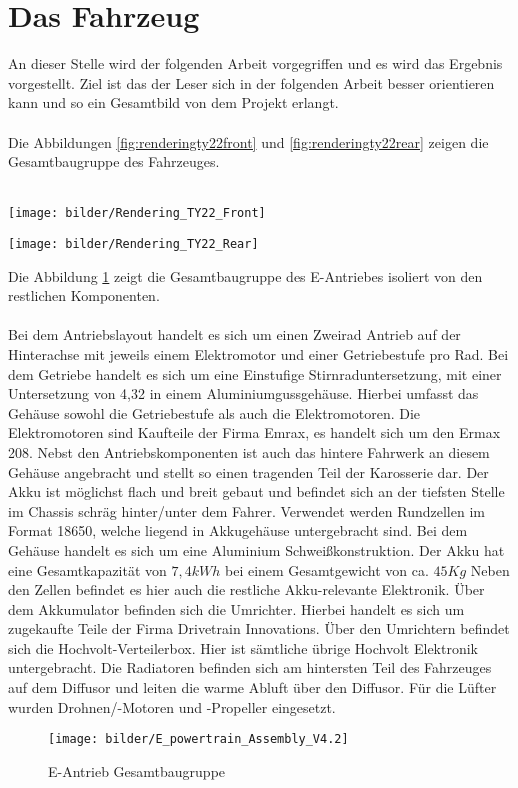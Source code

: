 \section{Das Fahrzeug}
An dieser Stelle wird der folgenden Arbeit vorgegriffen und es wird das Ergebnis vorgestellt. Ziel ist das der Leser sich in der folgenden Arbeit besser orientieren kann und so ein Gesamtbild von dem Projekt erlangt.\\
\\
Die Abbildungen \ref{fig:renderingty22front} und \ref{fig:renderingty22rear} zeigen die Gesamtbaugruppe des Fahrzeuges.\\
\\
	\begin{minipage}[b]{.5\linewidth} %
			\texttt{[image: bilder/Rendering\_TY22\_Front]}
			\label{fig:renderingty22front}
	\end{minipage}
	\begin{minipage}[b]{.5\linewidth} %
			\texttt{[image: bilder/Rendering\_TY22\_Rear]}
			\label{fig:renderingty22rear}
	\end{minipage}

Die Abbildung \ref{fig:epowertrainassemblyv4} zeigt die Gesamtbaugruppe des E-Antriebes isoliert von den restlichen Komponenten.\\
\\
Bei dem Antriebslayout handelt es sich um einen Zweirad Antrieb auf der Hinterachse mit jeweils einem Elektromotor und einer Getriebestufe pro Rad. Bei dem Getriebe handelt es sich um eine Einstufige Stirnraduntersetzung, mit einer Untersetzung von 4,32 in einem Aluminiumgussgehäuse. Hierbei umfasst das Gehäuse sowohl die Getriebestufe als auch die Elektromotoren. Die Elektromotoren sind Kaufteile der Firma Emrax, es handelt sich um den Ermax 208. Nebst den Antriebskomponenten ist auch das hintere Fahrwerk an diesem Gehäuse angebracht und stellt so einen tragenden Teil der Karosserie dar. Der Akku ist möglichst flach und breit gebaut und befindet sich an der tiefsten Stelle im Chassis schräg hinter/unter dem Fahrer. Verwendet werden Rundzellen im Format 18650, welche liegend in Akkugehäuse untergebracht sind. Bei dem Gehäuse handelt es sich um eine Aluminium Schweißkonstruktion. Der Akku hat eine Gesamtkapazität von \ensuremath{7,4 kWh} bei einem Gesamtgewicht von ca. \ensuremath{45 Kg} Neben den Zellen befindet es hier auch die restliche Akku-relevante Elektronik. Über dem Akkumulator befinden sich die Umrichter. Hierbei handelt es sich um zugekaufte Teile der Firma Drivetrain Innovations. Über den Umrichtern befindet sich die Hochvolt-Verteilerbox. Hier ist sämtliche übrige Hochvolt Elektronik untergebracht. Die Radiatoren befinden sich am hintersten Teil des Fahrzeuges auf dem Diffusor und leiten die warme Abluft über den Diffusor. Für die Lüfter wurden Drohnen/-Motoren und -Propeller eingesetzt.

\begin{figure}
	\centering
	\texttt{[image: bilder/E\_powertrain\_Assembly\_V4.2]}
	\caption{E-Antrieb Gesamtbaugruppe}
	\label{fig:epowertrainassemblyv4}
\end{figure}

\FloatBarrier